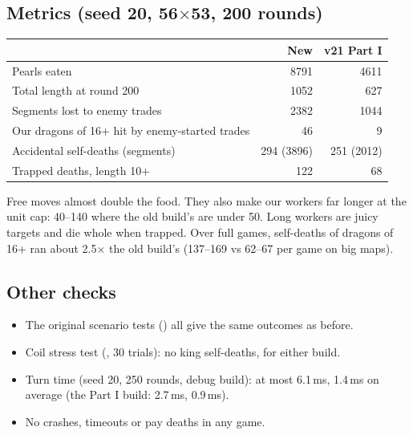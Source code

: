 \documentclass[11pt,a4paper]{article}
\newcommand{\code}[1]{\texttt{\detokenize{#1}}}
\begin{document}
\subsection{Metrics (seed 20, 56$\times$53, 200 rounds)}
\begin{center}
      \begin{tabular}{@{}lrr@{}}
            \toprule
                                                           & New        & v21 Part I \\
            \midrule
            Pearls eaten                                   & 8791       & 4611       \\
            Total length at round 200                      & 1052       & 627        \\
            Segments lost to enemy trades                  & 2382       & 1044       \\
            Our dragons of 16+ hit by enemy-started trades & 46         & 9          \\
            Accidental self-deaths (segments)              & 294 (3896) & 251 (2012) \\
            Trapped deaths, length 10+                     & 122        & 68         \\
            \bottomrule
      \end{tabular}
\end{center}
Free moves almost double the food. They also make our workers far longer at the unit cap: 40--140 where the old build's are
under 50. Long workers are juicy targets and die whole when trapped. Over full games, self-deaths of dragons of 16+ ran about
2.5$\times$ the old build's (137--169 vs 62--67 per game on big maps).

\subsection{Other checks}
\begin{itemize}
      \item The original scenario tests (\code{scen.py}) all give the same outcomes as before.
      \item Coil stress test (\code{stress_box.py}, 30 trials): no king self-deaths, for either build.
      \item Turn time (seed 20, 250 rounds, debug build): at most 6.1\,ms, 1.4\,ms on average (the Part I build: 2.7\,ms, 0.9\,ms).
      \item No crashes, timeouts or pay deaths in any game.
\end{itemize}
\end{document}
